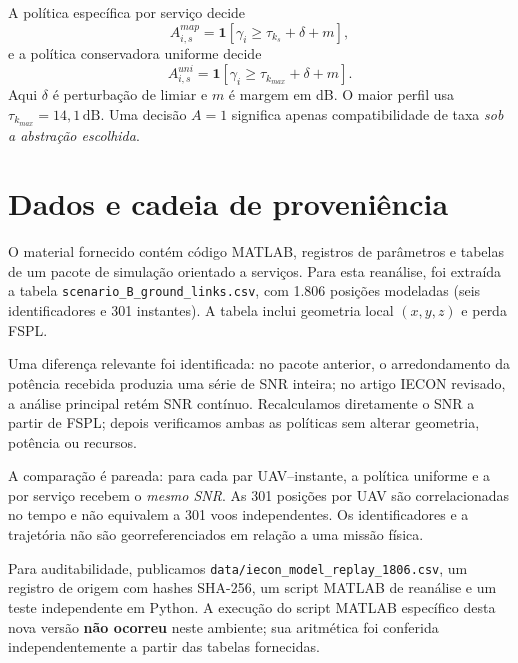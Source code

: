 \documentclass[10pt,a4paper,twocolumn]{article}
\begin{document}
A política específica por serviço decide
\begin{equation}
A^{map}_{i,s}=\mathbf{1}[\gamma_i\geq \tau_{k_s}+\delta+m],
\end{equation}
e a política conservadora uniforme decide
\begin{equation}
A^{uni}_{i,s}=\mathbf{1}[\gamma_i\geq \tau_{k_{max}}+\delta+m].
\end{equation}
Aqui $\delta$ é perturbação de limiar e $m$ é margem em dB. O maior perfil usa $\tau_{k_{max}}=14{,}1\,\mathrm{dB}$. Uma decisão $A=1$ significa apenas compatibilidade de taxa \emph{sob a abstração escolhida}.

\section{Dados e cadeia de proveniência}
O material fornecido contém código MATLAB, registros de parâmetros e tabelas de um pacote de simulação orientado a serviços. Para esta reanálise, foi extraída a tabela \texttt{scenario\_B\_ground\_links.csv}, com 1.806 posições modeladas (seis identificadores e 301 instantes). A tabela inclui geometria local $(x,y,z)$ e perda FSPL.

Uma diferença relevante foi identificada: no pacote anterior, o arredondamento da potência recebida produzia uma série de SNR inteira; no artigo IECON revisado, a análise principal retém SNR contínuo. Recalculamos diretamente o SNR a partir de FSPL; depois verificamos ambas as políticas sem alterar geometria, potência ou recursos.

A comparação é pareada: para cada par UAV--instante, a política uniforme e a por serviço recebem o \emph{mesmo SNR}. As 301 posições por UAV são correlacionadas no tempo e não equivalem a 301 voos independentes. Os identificadores e a trajetória não são georreferenciados em relação a uma missão física.

Para auditabilidade, publicamos \texttt{data/iecon\_model\_replay\_1806.csv}, um registro de origem com hashes SHA-256, um script MATLAB de reanálise e um teste independente em Python. A execução do script MATLAB específico desta nova versão \textbf{não ocorreu} neste ambiente; sua aritmética foi conferida independentemente a partir das tabelas fornecidas.
\end{document}
